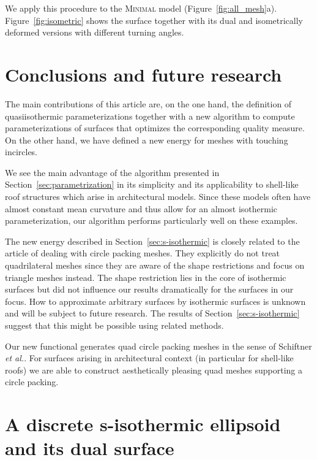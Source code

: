 \documentclass[Thesis.tex]{subfiles}
\begin{document}
We apply this procedure to the \textsc{Minimal} model
\mbox{(Figure~\ref{fig:all_mesh}a)}. Figure~\ref{fig:isometric} shows the
surface together
with its dual and isometrically deformed versions with different turning angles.


\section{Conclusions and future research}
\label{sec:future}
The main contributions of this article are, on the one hand, the definition of 
quasiisothermic parameterizations together with a new algorithm to
compute parameterizations of surfaces that optimizes the corresponding quality measure.
On the other hand, we have defined a new energy for meshes with touching incircles.

We see the main advantage of the algorithm presented in
Section~\ref{sec:parametrization} in its simplicity and its applicability to
shell-like roof structures which arise in architectural models. Since these
models often have almost constant mean curvature and thus allow for an almost
isothermic parameterization, our algorithm performs particularly well on these
examples.

The new energy described in Section~\ref{sec:s-isothermic} is closely related
to the article of \cite{SchiftnerHWP2009} dealing with
circle packing meshes. They explicitly do not treat quadrilateral meshes since
they are aware of the shape restrictions and focus on triangle meshes instead.
The shape restriction lies in the core of isothermic surfaces but
did not influence our results dramatically for the surfaces in our focus. How
to approximate arbitrary surfaces by isothermic surfaces is unknown and will be
subject to future research. The results of Section~\ref{sec:s-isothermic}
suggest that this might be possible using related methods.

Our new functional generates quad circle packing meshes in the sense of
Schiftner \emph{et al.}. For surfaces arising in architectural context (in
particular for shell-like roofs) we are able to construct aesthetically
pleasing quad meshes supporting a circle packing. 

\section{A discrete s-isothermic ellipsoid and its dual surface}
\end{document}
